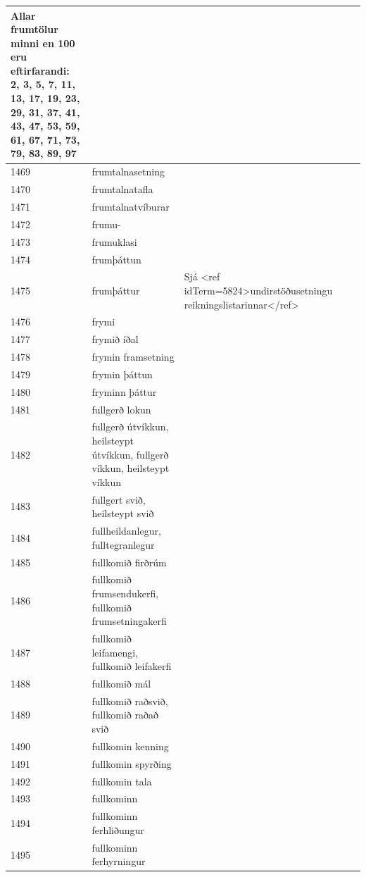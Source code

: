 \begin{longtable}{p{}|p{}|p{}|p{}|p{}}
Allar frumtölur minni en 100 eru eftirfarandi: 2, 3, 5, 7, 11, 13, 17, 19, 23, 29, 31, 37, 41, 43, 47, 53, 59, 61, 67, 71, 73, 79, 83, 89, 97 &  \\
\hline
1469 & frumtalnasetning &  &  &  \\
\hline
1470 & frumtalnatafla &  &  &  \\
\hline
1471 & frumtalnatvíburar &  &  &  \\
\hline
1472 & frumu- &  &  &  \\
\hline
1473 & frumuklasi &  &  &  \\
\hline
1474 & frumþáttun &  &  &  \\
\hline
1475 & frumþáttur & Sjá <ref idTerm=5824>undirstöðusetningu reikningslistarinnar</ref> &  &  \\
\hline
1476 & frymi &  &  &  \\
\hline
1477 & frymið íðal &  &  &  \\
\hline
1478 & frymin framsetning &  &  &  \\
\hline
1479 & frymin þáttun &  &  &  \\
\hline
1480 & fryminn þáttur &  &  &  \\
\hline
1481 & fullgerð lokun &  &  &  \\
\hline
1482 & fullgerð útvíkkun, heilsteypt útvíkkun, fullgerð víkkun, heilsteypt víkkun &  &  &  \\
\hline
1483 & fullgert svið, heilsteypt svið &  &  &  \\
\hline
1484 & fullheildanlegur, fulltegranlegur &  &  &  \\
\hline
1485 & fullkomið firðrúm &  &  &  \\
\hline
1486 & fullkomið frumsendukerfi, fullkomið frumsetningakerfi &  &  &  \\
\hline
1487 & fullkomið leifamengi, fullkomið leifakerfi &  &  &  \\
\hline
1488 & fullkomið mál &  &  &  \\
\hline
1489 & fullkomið raðsvið, fullkomið raðað svið &  &  &  \\
\hline
1490 & fullkomin kenning &  &  &  \\
\hline
1491 & fullkomin spyrðing &  &  &  \\
\hline
1492 & fullkomin tala &  &  &  \\
\hline
1493 & fullkominn &  &  &  \\
\hline
1494 & fullkominn ferhliðungur &  &  &  \\
\hline
1495 & fullkominn ferhyrningur &  &  &  \\

\end{longtable}

